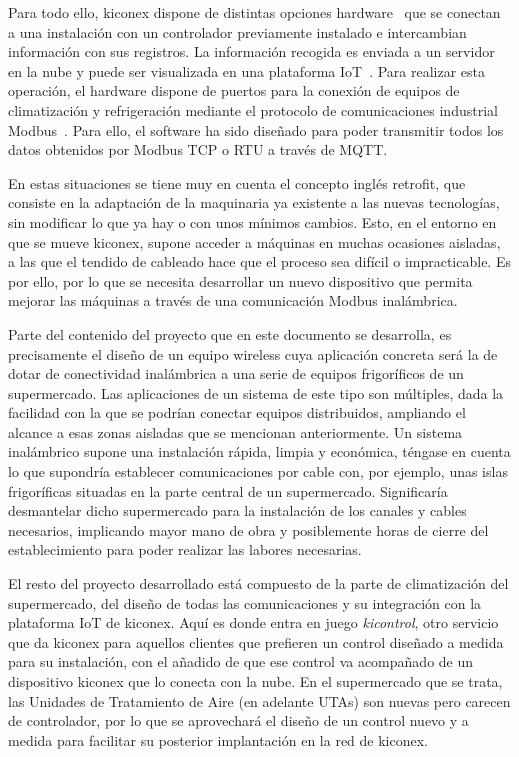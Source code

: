 Para todo ello, kiconex dispone de distintas opciones hardware~\cite{productoKiconex} que se conectan a una instalación con un controlador previamente instalado e intercambian información con sus registros. La información recogida es enviada a un servidor en la nube y puede ser visualizada en una plataforma IoT~\cite{appKiconex}. Para realizar esta operación, el hardware dispone de puertos para la conexión de equipos de climatización y refrigeración mediante el protocolo de comunicaciones industrial Modbus~\cite{modbusorg}. Para ello, el software ha sido diseñado para poder transmitir todos los datos obtenidos por Modbus TCP o RTU a través de MQTT.

En estas situaciones se tiene muy en cuenta el concepto inglés retrofit, que consiste en la adaptación de la maquinaria ya existente a las nuevas tecnologías, sin modificar lo que ya hay o con unos mínimos cambios. Esto, en el entorno en que se mueve kiconex, supone acceder a máquinas en muchas ocasiones aisladas, a las que el tendido de cableado hace que el proceso sea difícil o impracticable. Es por ello, por lo que se necesita desarrollar un nuevo dispositivo que permita mejorar las máquinas a través de una comunicación Modbus inalámbrica.

Parte del contenido del proyecto que en este documento se desarrolla, es precisamente el diseño de un equipo wireless cuya aplicación concreta será la de dotar de conectividad inalámbrica a una serie de equipos frigoríficos de un supermercado. Las aplicaciones de un sistema de este tipo son múltiples, dada la facilidad con la que se podrían conectar equipos distribuidos, ampliando el alcance a esas zonas aisladas que se mencionan anteriormente. Un sistema inalámbrico supone una instalación rápida, limpia y económica, téngase en cuenta lo que supondría establecer comunicaciones por cable con, por ejemplo, unas islas frigoríficas situadas en la parte central de un supermercado. Significaría desmantelar dicho supermercado para la instalación de los canales y cables necesarios, implicando mayor mano de obra y posiblemente horas de cierre del establecimiento para poder realizar las labores necesarias.

El resto del proyecto desarrollado está compuesto de la parte de climatización del supermercado, del diseño de todas las comunicaciones y su integración con la plataforma IoT de kiconex. Aquí es donde entra en juego \textit{kicontrol}, otro servicio que da kiconex para aquellos clientes que prefieren un control diseñado a medida para su instalación, con el añadido de que ese control va acompañado de un dispositivo kiconex que lo conecta con la nube. En el supermercado que se trata, las Unidades de Tratamiento de Aire (en adelante UTAs) son nuevas pero carecen de controlador, por lo que se aprovechará el diseño de un control nuevo y a medida para facilitar su posterior implantación en la red de kiconex.



